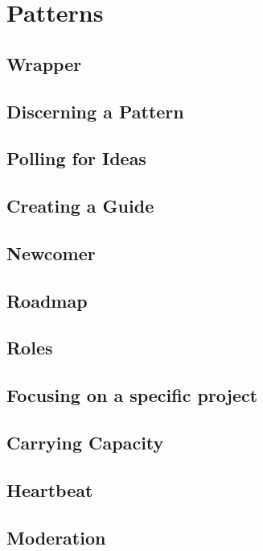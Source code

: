 \documentclass[ebook, 12pt, twoside]{memoir}
\begin{document}
\chapter[\textbf{Patterns}]{ Patterns }

\section*{Wrapper}

\section*{Discerning a Pattern}

\section*{Polling for Ideas}

\section*{Creating a Guide}

\section*{Newcomer}

\section*{Roadmap}

\section*{Roles}

\section*{Focusing on a specific project}

\section*{Carrying Capacity}

\section*{Heartbeat}

\section*{Moderation}

%
\end{document}
